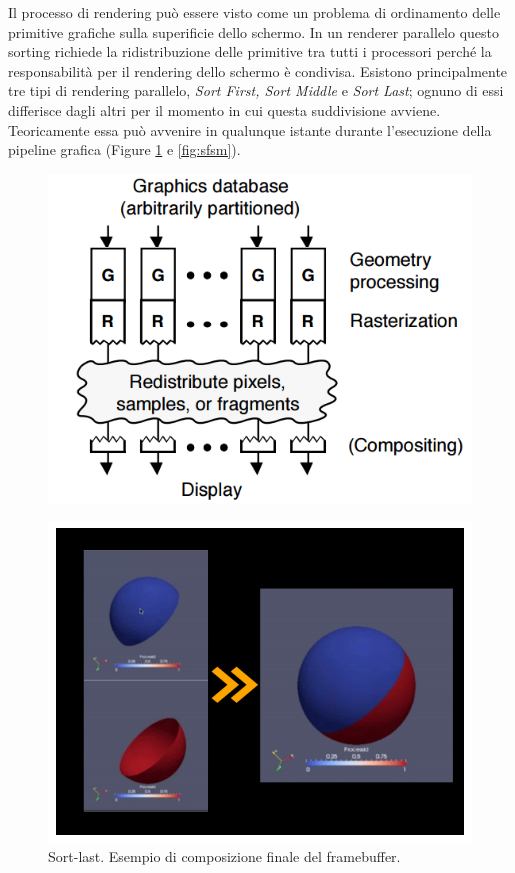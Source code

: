 Il processo di rendering può essere visto come un problema di ordinamento delle primitive grafiche sulla superificie dello schermo. In un renderer parallelo questo sorting richiede la ridistribuzione delle primitive tra tutti i processori perché la responsabilità per il rendering dello schermo è condivisa.
Esistono principalmente tre tipi di rendering parallelo, \textit{Sort First, Sort Middle} e \textit{Sort Last}; ognuno di essi differisce dagli altri per il momento in cui questa suddivisione avviene. Teoricamente essa può avvenire in qualunque istante durante l'esecuzione della pipeline grafica (Figure \ref{fig:sl} e \ref{fig:sfsm}).


\begin{figure}[!htbp]
	\centering
	\begin{minipage}{0.4\textwidth}
		\includegraphics[scale=0.28]{images/sortlatst}
		\label{fig:sf}
	\end{minipage}
	\hfill
	\begin{minipage}{0.5\textwidth}
		\includegraphics[scale=0.28]{images/sortlastex}
	\end{minipage}
	\caption{Sort-last. Esempio di composizione finale del framebuffer.}\label{fig:sl}
\end{figure}

